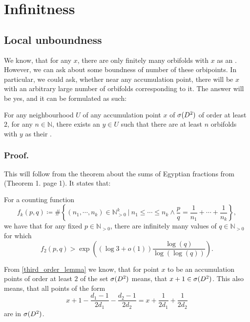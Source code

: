 \section{Infinitness}
\subsection{Local unboundness}
We know, that for any $x$, there are only finitely many orbifolds with $x$ as an \Eoc . 
However, we can ask about some boundness of number of these orbipoints. 
In particular, we could ask, whether near any accumulation point, there will be $x$ with an 
arbitrary large number of orbifolds corresponding to it. 
The answer will be yes, and it can be formulated as such:
\begin{theorem}\label{unboundness}
For any neighbourhood $U$ of any accumulation point $x$ of ${{\sigma}(D^2)}$ of order at least $2$, for any 
$n\in \mathbb{N}$, 
there exists an $y\in U$ such that there are at least $n$ orbifolds with $y$ as their 
\Eoc.
\end{theorem}
\subsubsection{Proof.}
This will follow from the theorem about the sums of Egyptian fractions from \cite{Browning2011} 
(Theorem 1. page 1).
It states that: 
\begin{theorem}
For a counting function
\begin{equation}
f_k(p,q) \coloneqq 
\#\left\{(n_1, \cdots, n_k)\in \mathbb{N}_{>0}^k\ \Big|\ n_1 \leq \cdots \leq n_k 
\land \frac{p}{q} = \frac{1}{n_1} + \cdots + \frac{1}{n_k}\right\},
\end{equation}
we have that for any fixed $p\in\mathbb{N}_{>0}$, there are infinitely many values of 
$q\in\mathbb{N}_{>0}$ for which
\begin{equation}
f_2(p,q) > \exp\left((\log{3}+o(1))\frac{\log(q)}{\log(\log(q))}\right).
\end{equation}
\end{theorem}

From \ref{third_order_lemma} we know, that for point $x$ to be an accumulation points of order 
at least $2$ of the set ${{\sigma}(D^2)}$ means, that $x + 1 \in {{\sigma}(D^2)}$. This also means, that 
all points of the form 
\begin{equation}\label{pq condition}
x + 1 - \frac{d_1-1}{2d_1} - \frac{d_2-1}{2d_2} = x + \frac{1}{2d_1} + \frac{1}{2d_2}
\end{equation} 
are in ${{\sigma}(D^2)}$. 

